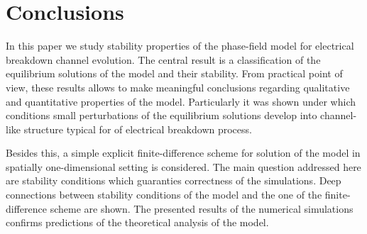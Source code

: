 
\section{Conclusions}

In this paper we study stability properties of the phase-field model
for electrical breakdown channel evolution.
The central result is a classification of the
equilibrium solutions of the model and their stability.
From practical point of view, these results allows to
make meaningful conclusions regarding qualitative and quantitative
properties of the model. Particularly it was shown under which
conditions small perturbations of the equilibrium solutions
develop into channel-like structure typical for of electrical breakdown
process.

Besides this, a simple explicit finite-difference scheme
for solution of the model in spatially one-dimensional setting is considered.
The main question addressed here are stability conditions which guaranties
correctness of the simulations. Deep connections between
stability conditions of the model and the one of the
finite-difference scheme are shown.
The presented results of the numerical simulations confirms
predictions of the theoretical analysis of the model.

\endinput